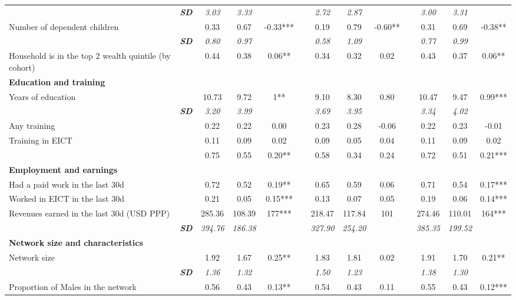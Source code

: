 \begin{landscape}
{\begin{longtable}{m{9cm}ccccccccccc}
\multicolumn{1}{r}{\textit{\textbf{SD}}}&\textit{3.03}&\textit{3.33}&&&\textit{2.72}&\textit{2.87}&&&\textit{3.00}&\textit{3.31}&\\
Number of dependent children&0.33&0.67&    -0.33***&&0.19&0.79&    -0.60**&&0.31&0.69&    -0.38**\\
\multicolumn{1}{r}{\textit{\textbf{SD}}}&\textit{0.80}&\textit{0.97}&&&\textit{0.58}&\textit{1.09}&&&\textit{0.77}&\textit{0.99}&\\
Household is in the top 2 wealth quintile (by cohort)&0.44&0.38&     0.06**&&0.34&0.32&     0.02 &&0.43&0.37&     0.06**\\
\textbf{Education and training}&&&&&&&&&&&\\
Years of education&10.73&9.72&        1**&&9.10&8.30&     0.80 &&10.47&9.47&     0.99***\\
\multicolumn{1}{r}{\textit{\textbf{SD}}}&\textit{3.20}&\textit{3.99}&&&\textit{3.69}&\textit{3.95}&&&\textit{3.34}&\textit{4.02}&\\
Any training&0.22&0.22&     0.00 &&0.23&0.28&    -0.06 &&0.22&0.23&    -0.01 \\
Training in EICT&0.11&0.09&     0.02 &&0.09&0.05&     0.04 &&0.11&0.09&     0.02 \\
&0.75&0.55&     0.20**&&0.58&0.34&     0.24 &&0.72&0.51&     0.21***\\
\textbf{Employment and earnings}&&&&&&&&&&&\\
Had a paid work in the last 30d&0.72&0.52&     0.19**&&0.65&0.59&     0.06 &&0.71&0.54&     0.17***\\
Worked in EICT in the last 30d&0.21&0.05&     0.15***&&0.13&0.07&     0.05 &&0.19&0.06&     0.14***\\
Revenues earned in the last 30d (USD PPP)&285.36&108.39&      177***&&218.47&117.84&      101 &&274.46&110.01&      164***\\
\multicolumn{1}{r}{\textit{\textbf{SD}}}&\textit{394.76}&\textit{186.38}&&&\textit{327.90}&\textit{254.20}&&&\textit{385.35}&\textit{199.52}&\\
\textbf{Network size and characteristics}&&&&&&&&&&&\\
Network size&1.92&1.67&     0.25**&&1.83&1.81&     0.02 &&1.91&1.70&     0.21**\\
\multicolumn{1}{r}{\textit{\textbf{SD}}}&\textit{1.36}&\textit{1.32}&&&\textit{1.50}&\textit{1.23}&&&\textit{1.38}&\textit{1.30}&\\
Proportion of Males in the network&0.56&0.43&     0.13**&&0.54&0.43&     0.11 &&0.55&0.43&     0.12***\\

\end{longtable}}
\end{landscape}
